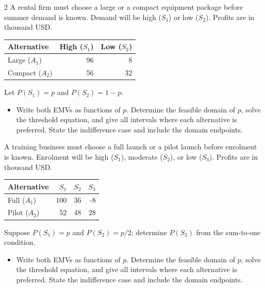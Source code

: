 \begin{multicols}{2}
A rental firm must choose a large or a compact equipment package before summer demand is known. Demand will be high ($S_1$) or low ($S_2$). Profits are in thousand USD.
\begin{center}\small\setlength{\tabcolsep}{4pt}
\begin{tabular}{@{}lrr@{}}\toprule
Alternative&High ($S_1$)&Low ($S_2$)\\\midrule
Large ($A_1$)&96&8\\
Compact ($A_2$)&56&32\\\bottomrule
\end{tabular}\end{center}
Let $P(S_1)=p$ and $P(S_2)=1-p$.
\begin{itemize}\item[\textbf{(C7)}] Write both EMVs as functions of $p$. Determine the feasible domain of $p$, solve the threshold equation, and give all intervals where each alternative is preferred. State the indifference case and include the domain endpoints. \end{itemize}
\columnbreak
{}
A training business must choose a full launch or a pilot launch before enrolment is known. Enrolment will be high ($S_1$), moderate ($S_2$), or low ($S_3$). Profits are in thousand USD.
\begin{center}\small\setlength{\tabcolsep}{4pt}
\begin{tabular}{@{}lrrr@{}}\toprule
Alternative&$S_1$&$S_2$&$S_3$\\\midrule
Full ($A_1$)&100&36&-8\\
Pilot ($A_2$)&52&48&28\\\bottomrule
\end{tabular}\end{center}
Suppose $P(S_1)=p$ and $P(S_2)=p/2$; determine $P(S_3)$ from the sum-to-one condition.
\begin{itemize}\item[\textbf{(C7)}] Write both EMVs as functions of $p$. Determine the feasible domain of $p$, solve the threshold equation, and give all intervals where each alternative is preferred. State the indifference case and include the domain endpoints. \end{itemize}


\end{multicols}
